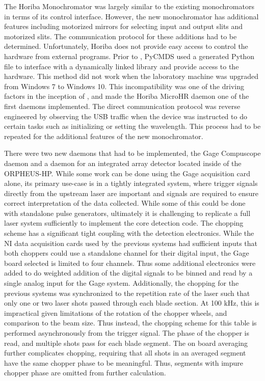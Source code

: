 The Horiba Monochromator was largely similar to the existing monochromators in terms of its control interface.
However, the new monochromator has additional features including motorized mirrors for selecting input and output slits and motorized slits.
The communication protocol for these additions had to be determined.
Unfortunately, Horiba does not provide easy access to control the hardware from external programs.
Prior to \yaq{}, PyCMDS used a generated Python file to interface with a dynamically linked library and provide access to the hardware.
This method did not work when the laboratory machine was upgraded from Windows 7 to Windows 10.
This incompatibility was one of the driving factors in the inception of \yaq{}, and made the Horiba MicroHR daemon one of the first daemons implemented.
The direct communication protocol was reverse engineered by observing the USB traffic when the device was instructed to do certain tasks such as initializing or setting the wavelength.
This process had to be repeated for the additional features of the new monochromator.

There were two new daemons that had to be implemented, the Gage Compuscope daemon and a daemon for an integrated array detector located inside of the ORPHEUS-HP.
While some work can be done using the Gage acquisition card alone, its primary use-case is in a tightly integrated system, where trigger signals directly from the upstream laser are important and signals are required to ensure correct interpretation of the data collected.
While some of this could be done with standalone pulse generators, ultimately it is challenging to replicate a full laser system sufficiently to implement the core detection code.
The chopping scheme has a significant tight coupling with the detection electronics.
While the NI data acquisition cards used by the previous systems had sufficient inputs that both choppers could use a standalone channel for their digital input, the Gage board selected is limited to four channels.
Thus some additional electronics were added to do weighted addition of the digital signals to be binned and read by a single analog input for the Gage system.
Additionally, the chopping for the previous systems was synchronized to the repetition rate of the laser such that only one or two laser shots passed through each blade section.
At 100 kHz, this is impractical given limitations of the rotation of the chopper wheels, and comparison to the beam size.
Thus instead, the chopping scheme for this table is performed asynchronously from the trigger signal.
The phase of the chopper is read, and multiple shots pass for each blade segment.
The on board averaging further complicates chopping, requiring that all shots in an averaged segment have the same chopper phase to be meaningful.
Thus, segments with impure chopper phase are omitted from further calculation.


